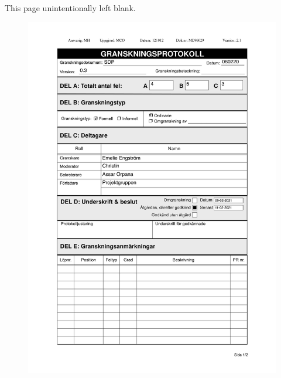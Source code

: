 \documentclass{article}
\begin{document}
\vspace*{\fill}
                \hfill
                \begin{center}
                This page unintentionally left blank.
                \end{center}
                \vspace{\fill}
                \thispagestyle{empty}
                

\begin{figure}
     \centering
     \includegraphics[width=13cm]{images/SDP - Granskningsprotokoll-1}
     \renewcommand\figurename{Figure}
     \label{fig:my_label}
 \end{figure}
 
\end{document}
